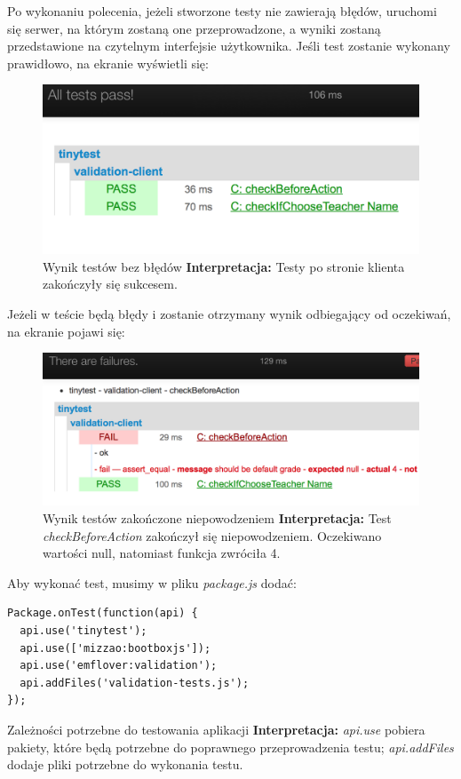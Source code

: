 \documentclass{xmgr}
\begin{document}
Po wykonaniu polecenia, jeżeli stworzone testy nie zawierają błędów, uruchomi się serwer, na którym zostaną one przeprowadzone, a wyniki zostaną przedstawione na czytelnym interfejsie użytkownika. Jeśli test zostanie wykonany prawidłowo, na ekranie wyświetli się:

\begin{figure}[H]
\centering
\includegraphics[width=0.7\hsize]{images/tinytestSucced}
\caption{Wynik testów bez błędów\label{RYS.20} \newline \newline \hspace{\linewidth} \textbf{Interpretacja:} Testy po stronie klienta zakończyły się sukcesem.}
\end{figure}

Jeżeli w teście będą błędy i zostanie otrzymany wynik odbiegający od oczekiwań, na ekranie pojawi się:
\begin{figure}[H]
\centering
\includegraphics[width=0.7\hsize]{images/tinytestFailure}
\caption{Wynik testów zakończone niepowodzeniem\label{RYS.21} \newline \newline \hspace{\linewidth} \textbf{Interpretacja:} Test \textit{checkBeforeAction} zakończył się niepowodzeniem. Oczekiwano wartości null, natomiast funkcja zwróciła 4.}
\end{figure}

Aby wykonać test, musimy w pliku \textit{package.js} dodać:

\begin{listing}[H]
\begin{verbatim}
Package.onTest(function(api) {
  api.use('tinytest');
  api.use(['mizzao:bootboxjs']);
  api.use('emflover:validation');
  api.addFiles('validation-tests.js');
});
\end{verbatim}
\caption{Zależności potrzebne do testowania aplikacji \newline \newline \hspace{\linewidth} \textbf{Interpretacja:} \textit{api.use} pobiera pakiety, które będą potrzebne do poprawnego przeprowadzenia testu; \textit{api.addFiles} dodaje pliki potrzebne do wykonania testu. \newline}
\end{listing}
\end{document}
